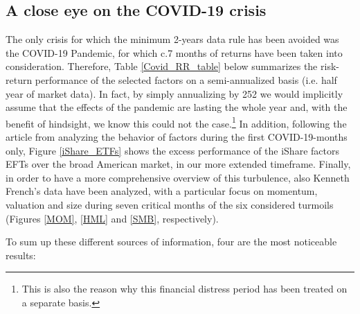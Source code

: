 \documentclass[12pt]{article}
\begin{document}
\subsection{A close eye on the COVID-19 crisis}

The only crisis for which the minimum 2-years data rule has been avoided was the COVID-19 Pandemic, for which c.7 months of returns have been taken into consideration. Therefore, Table \ref{Covid_RR_table} below summarizes the risk-return performance of the selected factors on a semi-annualized basis (i.e. half year of market data). In fact, by simply annualizing by 252 we would implicitly assume that the effects of the pandemic are lasting the whole year and, with the benefit of hindsight, we know this could not the case.\footnote{This is also the reason why this financial distress period has been treated on a separate basis.} In addition, following the article from  analyzing the behavior of factors during the first COVID-19-months only, Figure \ref{iShare_ETFs} shows the excess performance of the iShare factors EFTs over the broad American market, in our more extended timeframe. Finally, in order to have a more comprehensive overview of this turbulence, also Kenneth French's data have been analyzed, with a particular focus on momentum, valuation and size during seven critical months of the six considered turmoils (Figures \ref{MOM}, \ref{HML} and \ref{SMB}, respectively). 

To sum up these different sources of information, four are the most noticeable results:
\end{document}
